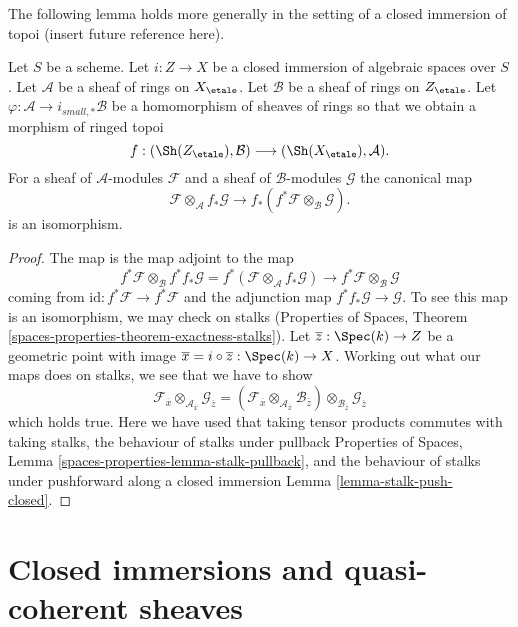 \noindent
The following lemma holds more generally in the setting of a closed
immersion of topoi (insert future reference here).

\begin{lemma}
\label{lemma-closed-immersion-rings}
Let $S$ be a scheme. Let $i : Z \to X$ be a closed immersion of algebraic
spaces over $S$. Let $\mathcal{A}$ be a sheaf of rings on $X_\etale$.
Let $\mathcal{B}$ be a sheaf of rings on $Z_\etale$.
Let $\varphi : \mathcal{A} \to i_{small, *}\mathcal{B}$
be a homomorphism of sheaves of rings so that we obtain a
morphism of ringed topoi
$$
f : (\Sh(Z_\etale), \mathcal{B}) \longrightarrow (\Sh(X_\etale), \mathcal{A}).
$$
For a sheaf of $\mathcal{A}$-modules $\mathcal{F}$ and a
sheaf of $\mathcal{B}$-modules $\mathcal{G}$ the canonical map
$$
\mathcal{F} \otimes_\mathcal{A} f_*\mathcal{G}
\longrightarrow
f_*(f^*\mathcal{F} \otimes_\mathcal{B} \mathcal{G}).
$$
is an isomorphism.
\end{lemma}

\begin{proof}
The map is the map adjoint to the map
$$
f^*\mathcal{F} \otimes_\mathcal{B}
f^* f_*\mathcal{G} =
f^*(\mathcal{F} \otimes_\mathcal{A} f_*\mathcal{G})
\longrightarrow
f^*\mathcal{F} \otimes_\mathcal{B} \mathcal{G}
$$
coming from $\text{id} : f^*\mathcal{F} \to f^*\mathcal{F}$
and the adjunction map $f^* f_*\mathcal{G} \to \mathcal{G}$.
To see this map is an isomorphism, we may check on stalks
(Properties of Spaces, Theorem
\ref{spaces-properties-theorem-exactness-stalks}).
Let $\overline{z} : \Spec(k) \to Z$ be a geometric point with
image $\overline{x} = i \circ \overline{z} : \Spec(k) \to X$.
Working out what our maps does on stalks, we see that we
have to show
$$
\mathcal{F}_{\overline{x}}
\otimes_{\mathcal{A}_{\overline{x}}}
\mathcal{G}_{\overline{z}} =
(\mathcal{F}_{\overline{x}}
\otimes_{\mathcal{A}_{\overline{x}}}
\mathcal{B}_{\overline{z}}) \otimes_{\mathcal{B}_{\overline{z}}}
\mathcal{G}_{\overline{z}}
$$
which holds true. Here we have used that
taking tensor products commutes with taking stalks, the
behaviour of stalks under pullback
Properties of Spaces, Lemma \ref{spaces-properties-lemma-stalk-pullback}, and
the behaviour of stalks under pushforward along a closed immersion
Lemma \ref{lemma-stalk-push-closed}.
\end{proof}






\section{Closed immersions and quasi-coherent sheaves}
\label{section-closed-immersions-quasi-coherent}


